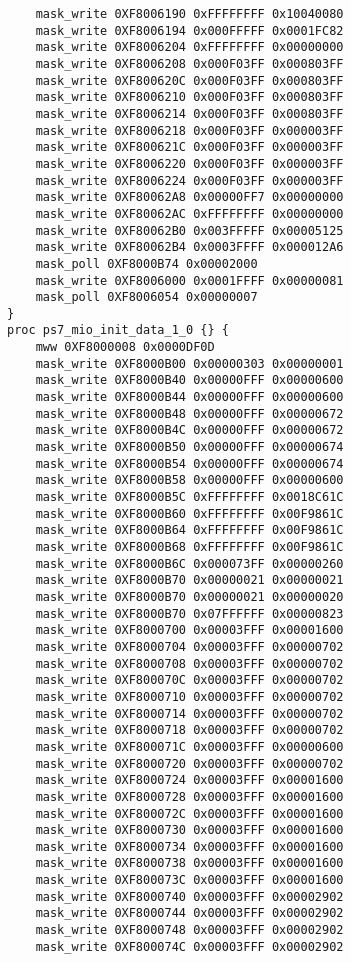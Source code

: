 \begin{lstlisting}
    mask_write 0XF8006190 0xFFFFFFFF 0x10040080
    mask_write 0XF8006194 0x000FFFFF 0x0001FC82
    mask_write 0XF8006204 0xFFFFFFFF 0x00000000
    mask_write 0XF8006208 0x000F03FF 0x000803FF
    mask_write 0XF800620C 0x000F03FF 0x000803FF
    mask_write 0XF8006210 0x000F03FF 0x000803FF
    mask_write 0XF8006214 0x000F03FF 0x000803FF
    mask_write 0XF8006218 0x000F03FF 0x000003FF
    mask_write 0XF800621C 0x000F03FF 0x000003FF
    mask_write 0XF8006220 0x000F03FF 0x000003FF
    mask_write 0XF8006224 0x000F03FF 0x000003FF
    mask_write 0XF80062A8 0x00000FF7 0x00000000
    mask_write 0XF80062AC 0xFFFFFFFF 0x00000000
    mask_write 0XF80062B0 0x003FFFFF 0x00005125
    mask_write 0XF80062B4 0x0003FFFF 0x000012A6
    mask_poll 0XF8000B74 0x00002000
    mask_write 0XF8006000 0x0001FFFF 0x00000081
    mask_poll 0XF8006054 0x00000007
}
proc ps7_mio_init_data_1_0 {} {
    mww 0XF8000008 0x0000DF0D
    mask_write 0XF8000B00 0x00000303 0x00000001
    mask_write 0XF8000B40 0x00000FFF 0x00000600
    mask_write 0XF8000B44 0x00000FFF 0x00000600
    mask_write 0XF8000B48 0x00000FFF 0x00000672
    mask_write 0XF8000B4C 0x00000FFF 0x00000672
    mask_write 0XF8000B50 0x00000FFF 0x00000674
    mask_write 0XF8000B54 0x00000FFF 0x00000674
    mask_write 0XF8000B58 0x00000FFF 0x00000600
    mask_write 0XF8000B5C 0xFFFFFFFF 0x0018C61C
    mask_write 0XF8000B60 0xFFFFFFFF 0x00F9861C
    mask_write 0XF8000B64 0xFFFFFFFF 0x00F9861C
    mask_write 0XF8000B68 0xFFFFFFFF 0x00F9861C
    mask_write 0XF8000B6C 0x000073FF 0x00000260
    mask_write 0XF8000B70 0x00000021 0x00000021
    mask_write 0XF8000B70 0x00000021 0x00000020
    mask_write 0XF8000B70 0x07FFFFFF 0x00000823
    mask_write 0XF8000700 0x00003FFF 0x00001600
    mask_write 0XF8000704 0x00003FFF 0x00000702
    mask_write 0XF8000708 0x00003FFF 0x00000702
    mask_write 0XF800070C 0x00003FFF 0x00000702
    mask_write 0XF8000710 0x00003FFF 0x00000702
    mask_write 0XF8000714 0x00003FFF 0x00000702
    mask_write 0XF8000718 0x00003FFF 0x00000702
    mask_write 0XF800071C 0x00003FFF 0x00000600
    mask_write 0XF8000720 0x00003FFF 0x00000702
    mask_write 0XF8000724 0x00003FFF 0x00001600
    mask_write 0XF8000728 0x00003FFF 0x00001600
    mask_write 0XF800072C 0x00003FFF 0x00001600
    mask_write 0XF8000730 0x00003FFF 0x00001600
    mask_write 0XF8000734 0x00003FFF 0x00001600
    mask_write 0XF8000738 0x00003FFF 0x00001600
    mask_write 0XF800073C 0x00003FFF 0x00001600
    mask_write 0XF8000740 0x00003FFF 0x00002902
    mask_write 0XF8000744 0x00003FFF 0x00002902
    mask_write 0XF8000748 0x00003FFF 0x00002902
    mask_write 0XF800074C 0x00003FFF 0x00002902

\end{lstlisting}
